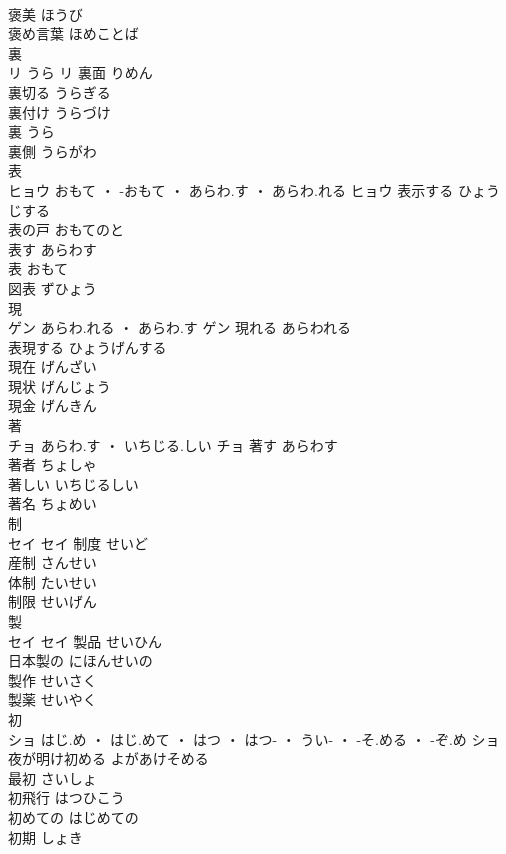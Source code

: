 \documentclass[8pt]{extreport}
\begin{document}
\begin{CJK}{UTF8}{min}
\\	褒美	ほうび	
\\	褒め言葉	ほめことば	
\\	裏	
\\	リ	うら	リ	裏面	りめん	
\\	裏切る	うらぎる	
\\	裏付け	うらづけ	
\\	裏	うら	
\\	裏側	うらがわ	
\\	表	
\\	ヒョウ	おもて ・ -おもて ・ あらわ.す ・ あらわ.れる	ヒョウ	表示する	ひょうじする	
\\	表の戸	おもてのと	
\\	表す	あらわす	
\\	表	おもて	
\\	図表	ずひょう	
\\	現	
\\	ゲン	あらわ.れる ・ あらわ.す	ゲン	現れる	あらわれる	
\\	表現する	ひょうげんする	
\\	現在	げんざい	
\\	現状	げんじょう	
\\	現金	げんきん	
\\	著	
\\	チョ	あらわ.す ・ いちじる.しい	チョ	著す	あらわす	
\\	著者	ちょしゃ	
\\	著しい	いちじるしい	
\\	著名	ちょめい	
\\	制	
\\	セイ		セイ	制度	せいど	
\\	産制	さんせい	
\\	体制	たいせい	
\\	制限	せいげん	
\\	製	
\\	セイ		セイ	製品	せいひん	
\\	日本製の	にほんせいの	
\\	製作	せいさく	
\\	製薬	せいやく	
\\	初	
\\	ショ	はじ.め ・ はじ.めて ・ はつ ・ はつ- ・ うい- ・ -そ.める ・ -ぞ.め	ショ	夜が明け初める	よがあけそめる	
\\	最初	さいしょ	
\\	初飛行	はつひこう	
\\	初めての	はじめての	
\\	初期	しょき	

\end{CJK}
\end{document}
